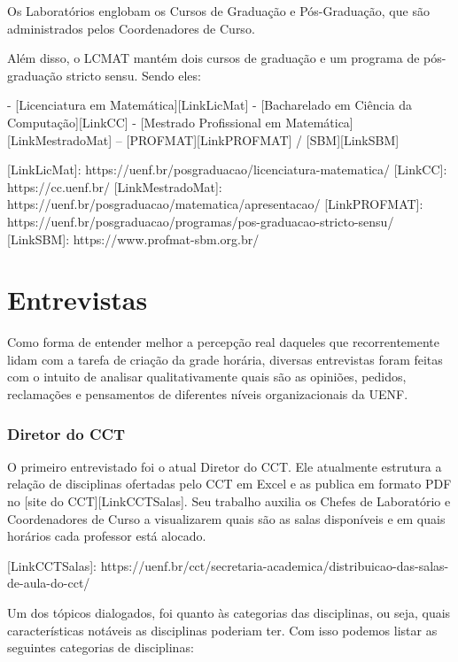     Os Laboratórios englobam os Cursos de Graduação e Pós-Graduação, que são administrados pelos Coordenadores de Curso.

    Além disso, o LCMAT mantém dois cursos de graduação e um programa de pós-graduação stricto sensu. Sendo eles:

    - [Licenciatura em Matemática][LinkLicMat]
    - [Bacharelado em Ciência da Computação][LinkCC]
    - [Mestrado Profissional em Matemática][LinkMestradoMat] – [PROFMAT][LinkPROFMAT] / [SBM][LinkSBM]

    [LinkLicMat]: https://uenf.br/posgraduacao/licenciatura-matematica/
    [LinkCC]: https://cc.uenf.br/
    [LinkMestradoMat]: https://uenf.br/posgraduacao/matematica/apresentacao/
    [LinkPROFMAT]: https://uenf.br/posgraduacao/programas/pos-graduacao-stricto-sensu/
    [LinkSBM]: https://www.profmat-sbm.org.br/

\section{Entrevistas} %


    Como forma de entender melhor a percepção real daqueles que recorrentemente lidam com a tarefa de criação da grade horária, diversas entrevistas foram feitas com o intuito de analisar qualitativamente quais são as opiniões, pedidos, reclamações e pensamentos de diferentes níveis organizacionais da UENF.

    \subsubsection{Diretor do CCT} %


        O primeiro entrevistado foi o atual Diretor do CCT. Ele atualmente estrutura a relação de disciplinas ofertadas pelo CCT em Excel e as publica em formato PDF no [site do CCT][LinkCCTSalas]. Seu trabalho auxilia os Chefes de Laboratório e Coordenadores de Curso a visualizarem quais são as salas disponíveis e em quais horários cada professor está alocado.

        [LinkCCTSalas]: https://uenf.br/cct/secretaria-academica/distribuicao-das-salas-de-aula-do-cct/

        Um dos tópicos dialogados, foi quanto às categorias das disciplinas, ou seja, quais características notáveis as disciplinas poderiam ter. Com isso podemos listar as seguintes categorias de disciplinas:

